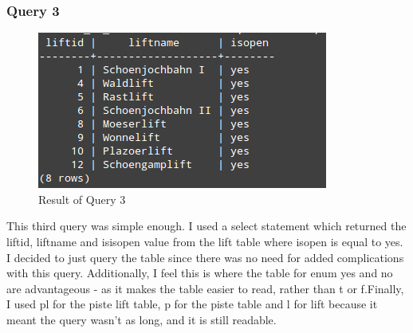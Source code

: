 \documentclass[12pt]{article}
\begin{document}
\subsubsection{Query 3}

\clearpage
\begin{figure}[htp]
\centering
\includegraphics[scale=0.60]{Screenshots/query3UPD(copy).png}
\caption{Result of Query 3}
\label{}
\end{figure}
This third query was simple enough. I used a select statement which returned the liftid, liftname and isisopen value from the lift table where isopen is equal to yes. I decided to just query the table since there was no need for added complications with this query. Additionally, I feel this is where the table for enum yes and no are advantageous - as it makes the table easier to read, rather than t or f.Finally, I used pl for the piste lift table, p for the piste table and l for lift because it meant the query wasn't as long, and it is still readable.
\end{document}
